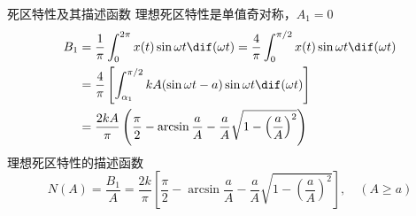\documentclass[handout,cjkutf8,table,aspectratio=1610]{beamer} %
\begin{document}
\begin{frame}{死区特性及其描述函数}\vs{-0.5em}
	理想死区特性是单值奇对称，$A_1=0$
	{\begin{align*}
		B_1	&= \frac{1}{\pi}\int_{0}^{2\pi}x(t)\sin\omega t\dif(\omega t)=\frac{4}{\pi}\int_0^{\pi/2}x(t)\sin\omega t\dif(\omega t)\\
			&= \frac{4}{\pi}\left[\int_{\alpha_1}^{\pi/2}kA(\sin\omega t-a)\sin\omega t\dif(\omega t)\right]\\
			&= \frac{2kA}{\pi}\left(\frac{\pi}{2}-\arcsin\frac{a}{A}-\frac{a}{A}\sqrt{1-\left(\frac{a}{A}\right)^2}\right)
	\end{align*}}
	理想死区特性的描述函数
	$$N(A)=\frac{B_1}{A}=\frac{2k}{\pi}\left[\frac{\pi}{2}-\arcsin\frac{a}{A}-\frac{a}{A}\sqrt{1-\left(\frac{a}{A}\right)^2}\right],\quad (A\ge a)$$
\end{frame}
\end{document}
